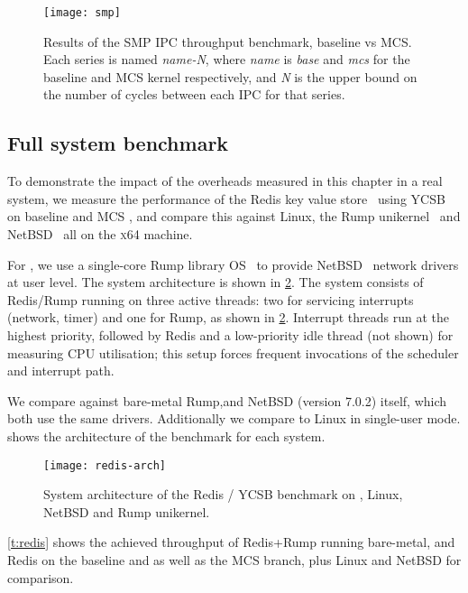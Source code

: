\begin{figure}[ht] 
    \centering
    \texttt{[image: smp]}
    \caption{Results of the SMP IPC throughput benchmark, baseline \selfour vs MCS. 
        Each series is named \textit{name-N}, where \textit{name} is \textit{base} and \textit{mcs} for 
        the baseline and MCS kernel respectively, and \textit{N} is the upper
        bound on the number of cycles between each IPC for that series.}
    \label{f:evaluation-smp}
\end{figure}

\subsection{Full system benchmark}
\label{s:evaluation-redis-overhead}

To demonstrate the impact of the overheads measured in this chapter in a real system,
we measure the performance of the Redis key value store~\citep{redis:url} using 
\gls{YCSB}~\citep{Cooper_STRS_10} on baseline and MCS \selfour, and compare this
against Linux, the Rump unikernel~\citep{Kantee_Cormack_14} and 
NetBSD~\citep{NetBSD:url} all on the \textsc{x64} machine.

For \selfour, we use a single-core Rump library OS~\citep{Kantee_Cormack_14} to provide 
NetBSD~\citep{NetBSD:url} network drivers at user level. The system architecture is 
shown in \cref{f:redis-arch}. 
The system consists of Redis/Rump running on three active \selfour threads: 
two for servicing interrupts (network, timer) and one for Rump, as shown in
\cref{f:redis-arch}. Interrupt threads run at the highest priority,
followed by Redis and a low-priority idle thread (not shown) for measuring CPU utilisation;
this setup forces frequent invocations of the scheduler and interrupt path.

We compare against bare-metal Rump,and
NetBSD (version 7.0.2) itself, which both use the same drivers. Additionally we compare to Linux 
in single-user mode.  shows the architecture of the benchmark for each system. 

 \begin{figure}[ht]
    \centering
    \texttt{[image: redis-arch]}
    \caption{System architecture of the Redis / \gls{YCSB} benchmark on \selfour, 
        Linux, NetBSD and Rump unikernel.}
    \label{f:redis-arch}
\end{figure}


\cref{t:redis} shows the achieved throughput of Redis+Rump
running  bare-metal, and Redis on the \selfour baseline and as well as the MCS
branch, plus Linux and NetBSD for comparison.

